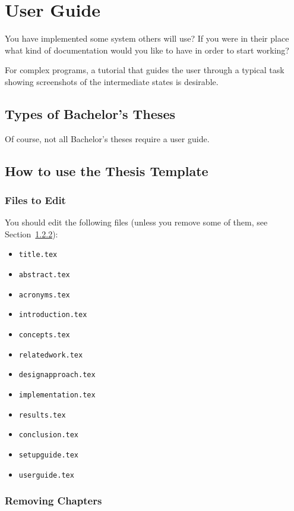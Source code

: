 
\chapter{User Guide}

You have implemented some system others will use? If you were in
their place what kind of documentation would you like to have in
order to start working?

For complex programs, a tutorial that guides the user through a
typical task showing screenshots of the intermediate states is
desirable.

\section{Types of Bachelor's Theses}

Of course, not all Bachelor's theses require a user guide.


\section{How to use the Thesis Template}

\subsection{Files to Edit}

You should edit the following files (unless you remove some of them,
see Section~\ref{section:removingchapters}):

\begin{itemize}
\item \tt title.tex
\item \tt abstract.tex
\item \tt acronyms.tex
\item \tt introduction.tex
\item \tt concepts.tex
\item \tt relatedwork.tex
\item \tt designapproach.tex
\item \tt implementation.tex
\item \tt results.tex
\item \tt conclusion.tex
\item \tt setupguide.tex
\item \tt userguide.tex
\end{itemize}

\subsection{Removing Chapters} \label{section:removingchapters}

